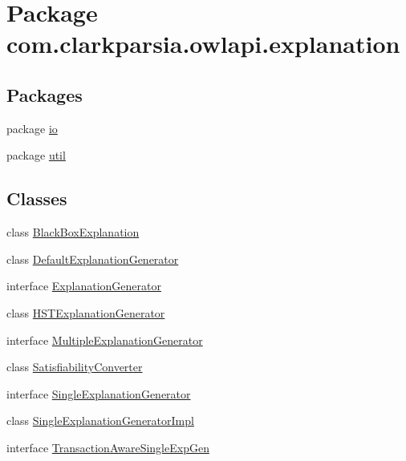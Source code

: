 \hypertarget{namespacecom_1_1clarkparsia_1_1owlapi_1_1explanation}{\section{Package com.\-clarkparsia.\-owlapi.\-explanation}
\label{namespacecom_1_1clarkparsia_1_1owlapi_1_1explanation}
}
\subsection*{Packages}
\begin{DoxyCompactItemize}
\item 
package \hyperlink{namespacecom_1_1clarkparsia_1_1owlapi_1_1explanation_1_1io}{io}
\item 
package \hyperlink{namespacecom_1_1clarkparsia_1_1owlapi_1_1explanation_1_1util}{util}
\end{DoxyCompactItemize}
\subsection*{Classes}
\begin{DoxyCompactItemize}
\item 
class \hyperlink{classcom_1_1clarkparsia_1_1owlapi_1_1explanation_1_1_black_box_explanation}{Black\-Box\-Explanation}
\item 
class \hyperlink{classcom_1_1clarkparsia_1_1owlapi_1_1explanation_1_1_default_explanation_generator}{Default\-Explanation\-Generator}
\item 
interface \hyperlink{interfacecom_1_1clarkparsia_1_1owlapi_1_1explanation_1_1_explanation_generator}{Explanation\-Generator}
\item 
class \hyperlink{classcom_1_1clarkparsia_1_1owlapi_1_1explanation_1_1_h_s_t_explanation_generator}{H\-S\-T\-Explanation\-Generator}
\item 
interface \hyperlink{interfacecom_1_1clarkparsia_1_1owlapi_1_1explanation_1_1_multiple_explanation_generator}{Multiple\-Explanation\-Generator}
\item 
class \hyperlink{classcom_1_1clarkparsia_1_1owlapi_1_1explanation_1_1_satisfiability_converter}{Satisfiability\-Converter}
\item 
interface \hyperlink{interfacecom_1_1clarkparsia_1_1owlapi_1_1explanation_1_1_single_explanation_generator}{Single\-Explanation\-Generator}
\item 
class \hyperlink{classcom_1_1clarkparsia_1_1owlapi_1_1explanation_1_1_single_explanation_generator_impl}{Single\-Explanation\-Generator\-Impl}
\item 
interface \hyperlink{interfacecom_1_1clarkparsia_1_1owlapi_1_1explanation_1_1_transaction_aware_single_exp_gen}{Transaction\-Aware\-Single\-Exp\-Gen}
\end{DoxyCompactItemize}

